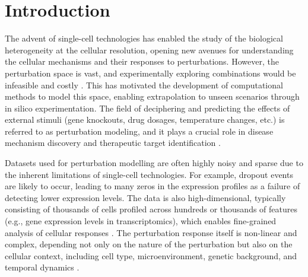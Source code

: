 \documentclass[12pt, a4paper]{article}
\begin{document}
\section{Introduction}


The advent of single-cell technologies has enabled the study of the biological heterogeneity at the cellular resolution, opening new avenues for understanding the cellular mechanisms and their responses to perturbations.
However, the perturbation space is vast, and experimentally exploring combinations would be infeasible and costly \cite{heumos2023best, kana2023generative}. This has motivated the development of computational methods to model this space, enabling extrapolation to unseen scenarios through in silico experimentation. The field of deciphering and predicting the effects of external stimuli (gene knockouts, drug dosages, temperature changes, etc.) is referred to as perturbation modeling, and it plays a crucial role in disease mechanism discovery and therapeutic target identification \cite{jiMachineLearningPerturbational2021}.





Datasets used for perturbation modelling are often highly noisy and sparse due to the inherent limitations of single-cell technologies. For example, dropout events are likely to occur, leading to many zeros in the expression profiles as a failure of detecting lower expression levels. The data is also high-dimensional, typically consisting of thousands of cells profiled across hundreds or thousands of features (e.g., gene expression levels in transcriptomics), which enables fine-grained analysis of cellular responses \cite{jiMachineLearningPerturbational2021}. The perturbation response itself is non-linear and complex, depending not only on the nature of the perturbation but also on the cellular context, including cell type, microenvironment, genetic background, and temporal dynamics \cite{gavriilidisMinireviewPerturbationModelling2024}.
\end{document}
